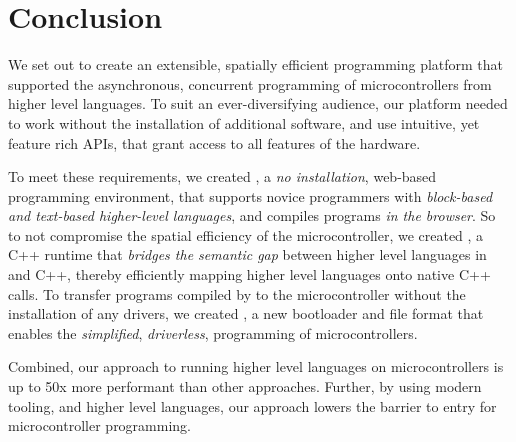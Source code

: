 \section{Conclusion}
\label{sec:conclude}

We set out to create an extensible, spatially efficient programming platform that supported the asynchronous, concurrent programming of microcontrollers from higher level languages. To suit an ever-diversifying audience, our platform needed to work without the installation of additional software, and use intuitive, yet feature rich APIs, that grant access to all features of the hardware.

To meet these requirements, we created \MCN, a \emph{no installation}, web-based programming environment, that supports novice programmers with \emph{block-based and text-based higher-level languages}, and compiles programs \emph{in the browser}. So to not compromise the spatial efficiency of the microcontroller, we created \CON, a C++ runtime that \emph{bridges the semantic gap} between higher level languages in \MC and C++, thereby efficiently mapping higher level languages onto native C++ calls. To transfer programs compiled by \MC to the microcontroller without the installation of any drivers, we created \UFN, a new bootloader and file format that enables the \emph{simplified}, \emph{driverless}, programming of microcontrollers.

Combined, our approach to running higher level languages on microcontrollers is up to 50x more performant than other approaches. Further, by using modern tooling, and higher level languages, our approach lowers the barrier to entry for microcontroller programming.


